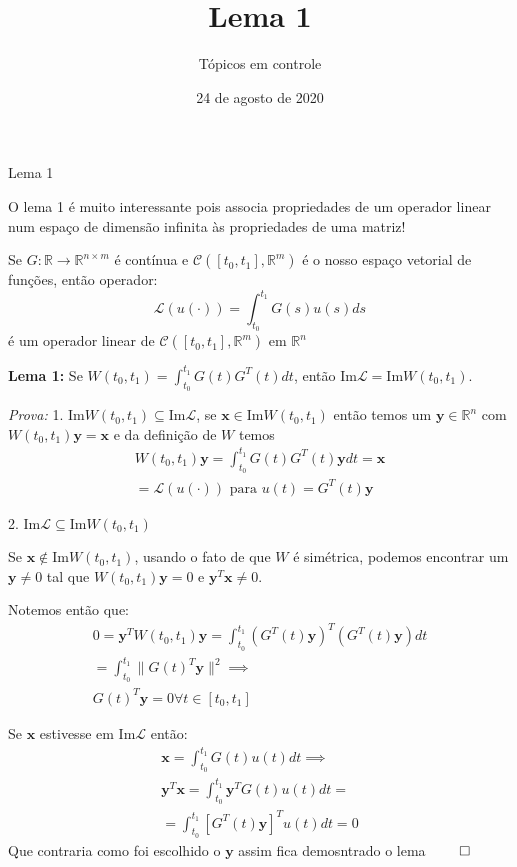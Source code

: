 \documentclass{beamer}
\title[]{Lema 1}
\author{Tópicos em controle}
\institute{IME USP}
\date{24 de agosto de 2020}
\begin{document}
\begin{frame}
  \titlepage
\end{frame}

\begin{frame}{Lema 1}

 O lema 1 é muito interessante pois associa propriedades de um operador linear 
 num espaço de dimensão infinita às propriedades de uma matriz!

 Se $G: \mathbb{R} \to \mathbb{R}^{n\times m}$ é contínua e $\mathcal{C}([t_0,t_1], \mathbb{R}^m)$
 é o nosso espaço vetorial de funções, então operador:
 $$ \mathcal{L}(u(\cdot) )=\int_{t_0}^{t_1}G(s)u(s)ds $$
 é um operador linear de 
 $\mathcal{C}([t_0,t_1], \mathbb{R}^m)$ em $\mathbb{R}^n$
  
\end{frame}
\begin{frame}
\textbf{Lema 1:} Se $W(t_0,t_1) = \int_{t_0}^{t_1}G(t)G^T(t)dt$, então 
$\text{Im}\mathcal{L} = \text{Im}W(t_0,t_1)$.

\textit{Prova: }
1. $\text{Im}W(t_0,t_1) \subseteq \text{Im}\mathcal{L}$, se $\mathbf{x} \in 
\text{Im}W(t_0,t_1)$ então temos um $\mathbf{y} \in \mathbb{R}^n$ com
$W(t_0,t_1)\mathbf{y} = \mathbf{x}$ e da definição de $W$ temos
\begin{gather*}
  W(t_0,t_1)\mathbf{y} = \int_{t_0}^{t_1}G(t)G^T(t)\mathbf{y}dt = \mathbf{x}\\
  = \mathcal{L}(u(\cdot)) \text{ para } u(t) = G^T(t)\mathbf{y}
\end{gather*}
\end{frame}

\begin{frame}
  2. $\text{Im}\mathcal{L} \subseteq \text{Im}W(t_0,t_1)$

  Se $\mathbf{x} \not\in \text{Im}W(t_0,t_1)$, usando o fato de que $W$ é simétrica,
  podemos encontrar um $\mathbf{y}\neq 0$ tal que $W(t_0,t_1)\mathbf{y}=0$ e 
  $\mathbf{y}^T\mathbf{x} \neq 0$.

  Notemos então que:
  \begin{gather*}
    0= \mathbf{y}^TW(t_0,t_1)\mathbf{y} = \int_{t_0}^{t_1}(G^T(t)\mathbf{y})^T(G^T(t)\mathbf{y})dt \\
    = \int_{t_0}^{t_1}\|G(t)^T\mathbf{y}\|^2 \implies \\
    G(t)^T\mathbf{y}=0 \forall t\in[t_0,t_1]
  \end{gather*}
\end{frame}

\begin{frame}
  Se $\mathbf{x}$ estivesse em $\text{Im}\mathcal{L}$ então:
  \begin{gather*}
    \mathbf{x} = \int_{t_0}^{t_1}G(t)u(t)dt \implies \\
    \mathbf{y}^T\mathbf{x}=\int_{t_0}^{t_1}\mathbf{y}^TG(t)u(t)dt = \\
    = \int_{t_0}^{t_1} [G^T(t)\mathbf{y}]^Tu(t) dt = 0
  \end{gather*}
  Que contraria como foi escolhido o $\mathbf{y}$
  assim fica demosntrado o lema $\qed$
\end{frame}
\end{document}
